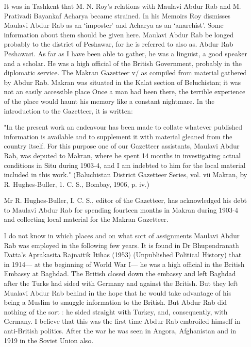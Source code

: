 It was in Tashkent that M. N. Roy’s relations with Maulavi Abdur Rab and M. Prativadi Bayankaf Acharya became strained. In his Memoirs Roy dismisses Maulavi Abdur Rab as an ‘imposter’ and Acharya as an ‘anarchist’. Some information about them should be given here. Maulavi Abdur Rab be longed probably to the district of Peshawar, for he is referred to also as. Abdur Rab Peshawari. As far as I have been able to gather, he was a linguist, a good speaker and a scholar. He was a high official of the British Government, probably in the diplomatic service. The Makran Gazetteer v/ as compiled from material gathered by Abdur Rab. Makran was situated in the Kalat section of Beluchistan; it was not an easily 
accessible place Once a man had been there, the terrible experience of the place would haunt his memory like a constant nightmare. In the introduction to the Gazetteer, it is written:

"In the present work an endeavour has been made to collate whatever published information is available and to supplement it with material gleaned from the country itself. For this purpose one of our Gazetteer assistants, Maulavi Abdur Rab, was deputed to Makran, where he spent 14 months in investigating actual conditions in Situ during 1903-4, and I am indebted to him for the local material included in this work." (Baluchistan District Gazetteer Series, vol. vii Makran, by R. Hughes-Buller, 1. C. S., Bombay, 1906, p. iv.) 

Mr R. Hughes-Buller, I. C. S., editor of the Gazetteer, has acknowledged his debt to Maulavi Abdur Rab for spending fourteen months in Makran during 1903-4 and collecting local material for the Makran Gazetteer.   

I do not know in which places and on what sort of assignments Maulavi Abdur Rab was employed in the following few years. It is found in Dr Bhupendranath Datta’s Aprakasita Rajnaitik Itihas (1953) (Unpublished Political History) that in 1914— at the beginning of World War I— he 
was a high official in the British Embassy at Baghdad. The British closed down the embassy and left Baghdad after the Turks had sided with Germany and against the British. But they left Mualavi Abdur Rab behind in the hope that he would take advantage of his being a Muslim to smuggle information to the British. But Abdur Rab did nothing of the sort : he sided straight with Turkey, and, consequently, with Germany. I believe that this was the first time Abdur Rab embroiled himself in anti-British politics. After the war he was seen in Angora, Afghanistan and in 1919 in the Soviet Union also. 

